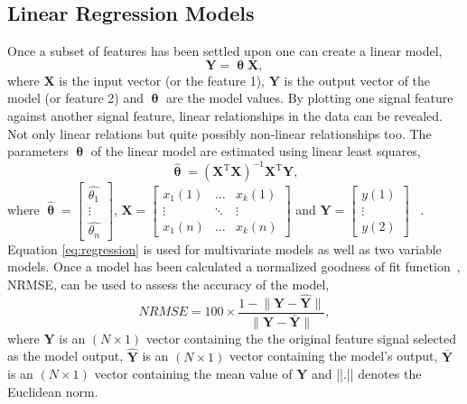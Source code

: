 \documentclass[]{article}
\begin{document}
\subsection{Linear Regression Models}
Once a subset of features has been settled upon one can create a linear model,
\begin{equation} \label{eq:linearModel}
	\mathbf{Y} = \boldsymbol{\uptheta} \mathbf{X},
\end{equation}
where $\mathbf{X}$ is the input vector (or the feature 1), $\mathbf{Y}$ is the output vector of the model (or feature 2) and $\boldsymbol{\uptheta}$ are the model values. By plotting one signal feature against another signal feature, linear relationships in the data can be revealed. Not only linear relations but quite possibly non-linear relationships too. The parameters $\boldsymbol{\uptheta}$ of the linear model are estimated using linear least squares, 
\begin{equation} \label{eq:regression}
	\hat{\boldsymbol{\uptheta}} = (\mathbf{X}^{\textrm{T}} \mathbf{X})^{-1} \mathbf{X}^{\textrm{T}} \mathbf{Y},
\end{equation}
where $ \hat{\boldsymbol{\uptheta}} = \begin{bmatrix} \hat{\theta_{1}} \\ \vdots \\ \hat{\theta_{n}} \end{bmatrix} $, $ \mathbf{X} = \begin{bmatrix} x_{1}(1) & \hdots & x_{k}(1) \\ \vdots & \ddots & \vdots \\ x_{1}(n) & \hdots & x_{k}(n)  \end{bmatrix}$ and 
$ \mathbf{Y} = \begin{bmatrix} y(1) \\ \vdots \\ y(2)\end{bmatrix}$ ~\cite{james2013introduction}.\\
Equation \ref{eq:regression} is used for multivariate models as well as two variable models. Once a model has been calculated a normalized goodness of fit function~\cite{gonzalez2023time}, \gls{NRMSE}, can be used to assess the accuracy of the model,
\begin{equation}
	NRMSE = 100 \times \frac{ 1 - \lVert\mathbf{Y} - \mathbf{\hat{Y}}\rVert } { \lVert \mathbf{Y} - \mathbf{\bar{Y}} \rVert },
\end{equation}
where $\mathbf{Y}$ is an $(N \times 1)$ vector containing the the original feature signal selected as the model output, $\mathbf{\hat{Y}}$ is an $(N \times 1)$ vector containing the model’s output, $\mathbf{\bar{Y}}$ is an $(N \times 1)$ vector containing the mean value of $\mathbf{Y}$ and ||.|| denotes the Euclidean norm.
\end{document}
